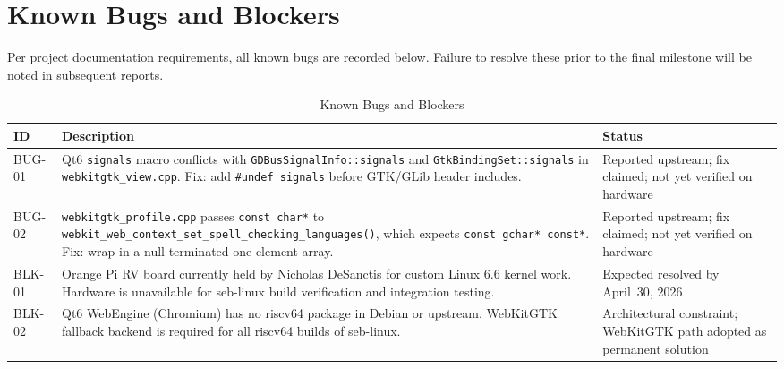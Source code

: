 \documentclass[11pt]{article}
\begin{document}
\newpage
\section{Known Bugs and Blockers}
\label{sec:bugs}

Per project documentation requirements, all known bugs are recorded below. Failure to resolve these prior to the final milestone will be noted in subsequent reports.

\begin{table}[h!]
\centering
\caption{Known Bugs and Blockers}
\label{tab:bugs}
\begin{tabularx}{\textwidth}{|p{1cm}|X|p{3.5cm}|}
\hline
\textbf{ID} & \textbf{Description} & \textbf{Status} \\ \hline
BUG-01 &
  Qt6 \texttt{signals} macro conflicts with \texttt{GDBusSignalInfo::signals} and \texttt{GtkBindingSet::signals} in \texttt{webkitgtk\_view.cpp}. Fix: add \texttt{\#undef signals} before GTK/GLib header includes. &
  Reported upstream; fix claimed; not yet verified on hardware \\ \hline
BUG-02 &
  \texttt{webkitgtk\_profile.cpp} passes \texttt{const char*} to \texttt{webkit\_web\_context\_set\_spell\_checking\_languages()}, which expects \texttt{const gchar* const*}. Fix: wrap in a null-terminated one-element array. &
  Reported upstream; fix claimed; not yet verified on hardware \\ \hline
BLK-01 &
  Orange Pi RV board currently held by Nicholas DeSanctis for custom Linux 6.6 kernel work. Hardware is unavailable for seb-linux build verification and integration testing. &
  Expected resolved by April~30, 2026 \\ \hline
BLK-02 &
  Qt6 WebEngine (Chromium) has no riscv64 package in Debian or upstream. WebKitGTK fallback backend is required for all riscv64 builds of seb-linux. &
  Architectural constraint; WebKitGTK path adopted as permanent solution \\ \hline
\end{tabularx}
\end{table}
\end{document}
